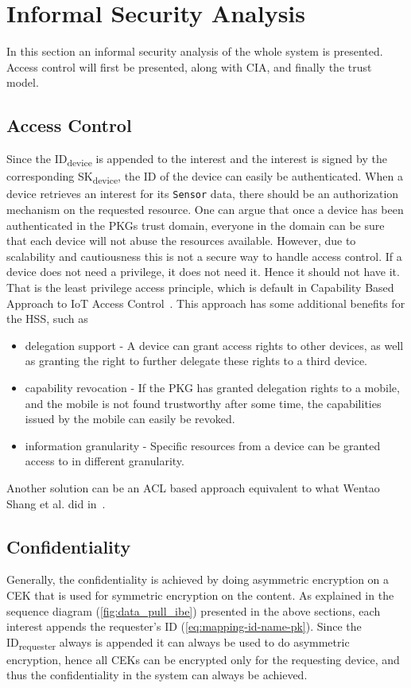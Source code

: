 \section{Informal Security Analysis}
In this section an informal security analysis of the whole system is presented.
Access control will first be presented, along with \gls{CIA}, and finally the trust model.

\subsection{Access Control}\label{access_control}
Since the ID\textsubscript{device} is appended to the \gls{interest} and the \gls{interest} is signed by the corresponding SK\textsubscript{device}, the \gls{ID} of the device can easily be authenticated. 
When a device retrieves an \gls{interest} for its \texttt{Sensor} \gls{data}, there should be an authorization mechanism on the requested resource. 
One can argue that once a device has been authenticated in the \gls{PKG}s trust domain, everyone in the domain can be sure that each device will not abuse the resources available. 
However, due to scalability and cautiousness this is not a secure way to handle access control. 
If a device does not need a privilege, it does not need it.
Hence it should not have it. 
That is the least privilege access principle, which is default in Capability Based Approach to \gls{IoT} Access Control~\cite{DBLP:conf/imis/GusmeroliPR12}.
This approach has some additional benefits for the \gls{HSS}, such as

\begin{itemize}
  \item delegation support - 
  A device can grant access rights to other devices, as well as granting the right to further delegate these rights to a third device.
  \item capability revocation - 
  If the \gls{PKG} has granted delegation rights to a mobile, and the mobile is not found trustworthy after some time, the capabilities issued by the mobile can easily be revoked.
  \item information granularity - 
  Specific resources from a device can be granted access to in different granularity.
\end{itemize}

Another solution can be an \gls{ACL} based approach equivalent to what Wentao Shang et al. did in~\cite{DBLP:journals/network/ShangDMBZ14}.

\subsection{Confidentiality}
Generally, the confidentiality is achieved by doing asymmetric encryption on a \gls{CEK} that is used for symmetric encryption on the content.
As explained in the sequence diagram (\autoref{fig:data_pull_ibe}) presented in the above sections, each \gls{interest} appends the requester's ID (\autoref{eq:mapping-id-name-pk}).
Since the ID\textsubscript{requester} always is appended it can always be used to do asymmetric encryption, hence all \gls{CEK}s can be encrypted only for the requesting device, and thus the confidentiality in the system can always be achieved.

